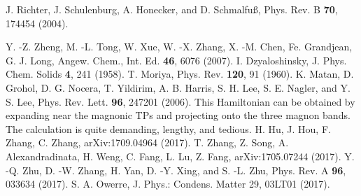 \documentclass[doublecol]{epl2}
\begin{document}
\begin{thebibliography}{0}
 J. Richter, J. Schulenburg, A. Honecker, and D. Schmalfu{\ss}, 
Phys. Rev. B {\bf 70}, 174454 (2004).
   
Y. -Z. Zheng, M. -L. Tong, W. Xue, W. -X.  Zhang, X. -M.  Chen, Fe. Grandjean, G. J.  Long, Angew. Chem., Int. Ed. {\bf 46}, 6076 (2007).
I. Dzyaloshinsky, J. Phys. Chem. Solids {\bf 4}, 241 (1958).
T. Moriya, Phys. Rev. {\bf 120}, 91 (1960).
K. Matan, D. Grohol, D. G. Nocera, T. Yildirim, A. B. Harris, S. H. Lee, S. E. Nagler, and Y. S. Lee, Phys. Rev. Lett. {\bf 96}, 247201 (2006).
 This Hamiltonian can be obtained by expanding near the magnonic TPs and projecting onto the three magnon bands. The calculation is quite demanding, lengthy, and tedious. 
 H. Hu, J. Hou, F. Zhang, C. Zhang, arXiv:1709.04964 (2017).
 T. Zhang, Z. Song, A. Alexandradinata, H. Weng, C. Fang, L. Lu, Z. Fang, arXiv:1705.07244 (2017).
 Y. -Q. Zhu, D. -W.  Zhang, H.  Yan, D. -Y.  Xing, and S. -L.  Zhu, Phys. Rev. A {\bf 96}, 033634 (2017).
  S. A. Owerre, J. Phys.: Condens. Matter 29, 03LT01 (2017).


\end{thebibliography}
\end{document}
